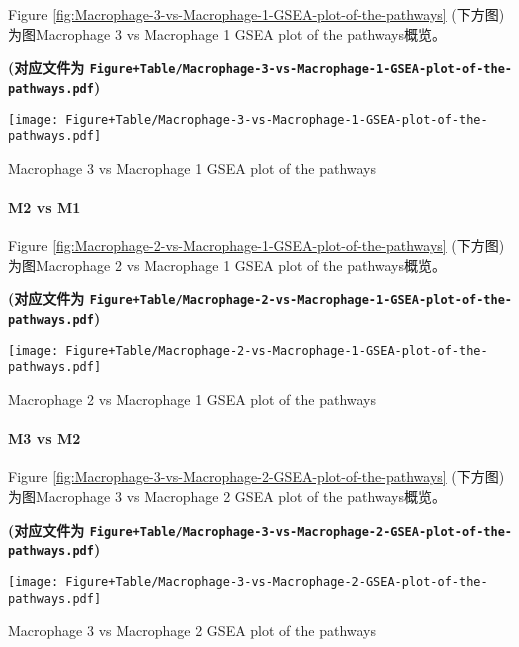 \documentclass[
]{article}
\begin{document}
Figure \ref{fig:Macrophage-3-vs-Macrophage-1-GSEA-plot-of-the-pathways} (下方图) 为图Macrophage 3 vs Macrophage 1 GSEA plot of the pathways概览。

\textbf{(对应文件为 \texttt{Figure+Table/Macrophage-3-vs-Macrophage-1-GSEA-plot-of-the-pathways.pdf})}

\def\@captype{figure}
\begin{center}
\texttt{[image: Figure+Table/Macrophage-3-vs-Macrophage-1-GSEA-plot-of-the-pathways.pdf]}
\caption{Macrophage 3 vs Macrophage 1 GSEA plot of the pathways}\label{fig:Macrophage-3-vs-Macrophage-1-GSEA-plot-of-the-pathways}
\end{center}

\hypertarget{m2-vs-m1}{%
\paragraph{M2 vs M1}\label{m2-vs-m1}}

Figure \ref{fig:Macrophage-2-vs-Macrophage-1-GSEA-plot-of-the-pathways} (下方图) 为图Macrophage 2 vs Macrophage 1 GSEA plot of the pathways概览。

\textbf{(对应文件为 \texttt{Figure+Table/Macrophage-2-vs-Macrophage-1-GSEA-plot-of-the-pathways.pdf})}

\def\@captype{figure}
\begin{center}
\texttt{[image: Figure+Table/Macrophage-2-vs-Macrophage-1-GSEA-plot-of-the-pathways.pdf]}
\caption{Macrophage 2 vs Macrophage 1 GSEA plot of the pathways}\label{fig:Macrophage-2-vs-Macrophage-1-GSEA-plot-of-the-pathways}
\end{center}

\hypertarget{m3-vs-m2}{%
\paragraph{M3 vs M2}\label{m3-vs-m2}}

Figure \ref{fig:Macrophage-3-vs-Macrophage-2-GSEA-plot-of-the-pathways} (下方图) 为图Macrophage 3 vs Macrophage 2 GSEA plot of the pathways概览。

\textbf{(对应文件为 \texttt{Figure+Table/Macrophage-3-vs-Macrophage-2-GSEA-plot-of-the-pathways.pdf})}

\def\@captype{figure}
\begin{center}
\texttt{[image: Figure+Table/Macrophage-3-vs-Macrophage-2-GSEA-plot-of-the-pathways.pdf]}
\caption{Macrophage 3 vs Macrophage 2 GSEA plot of the pathways}\label{fig:Macrophage-3-vs-Macrophage-2-GSEA-plot-of-the-pathways}
\end{center}
\end{document}
